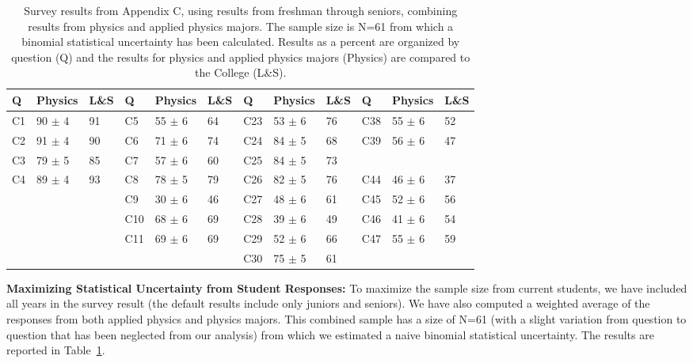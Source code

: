 \documentclass[12pt]{article}
\begin{document}
\begin{table}[htbp]
\caption{\label{tbl:appc} Survey results from Appendix C, using results from freshman through 
seniors, combining results from physics and applied physics majors. The sample size is N=61 
from which a binomial statistical uncertainty has been calculated.  Results as a percent are 
organized by question (Q) and the results for physics and applied physics majors (Physics) are 
compared to the College (L\&S).}
\begin{center}
\begin{tabular}{|lll|lll|lll|lll|}
\hline
Q & Physics & L\&S & Q & Physics & L\&S & Q & Physics & L\&S & Q & Physics & L\&S \\
\hline
C1 & 90 $\pm$ 4 & 91 & C5  & 55 $\pm$ 6 & 64 & C23 & 53 $\pm$ 6 & 76 & C38 & 55 $\pm$ 6 & 52 \\
C2 & 91 $\pm$ 4 & 90 & C6  & 71 $\pm$ 6 & 74 & C24 & 84 $\pm$ 5 & 68 & C39 & 56 $\pm$ 6 & 47 \\
C3 & 79 $\pm$ 5 & 85 & C7  & 57 $\pm$ 6 & 60 & C25 & 84 $\pm$ 5 & 73 &     &            &    \\                  
C4 & 89 $\pm$ 4 & 93 & C8  & 78 $\pm$ 5 & 79 & C26 & 82 $\pm$ 5 & 76 & C44 & 46 $\pm$ 6 & 37 \\
~  &            &    & C9  & 30 $\pm$ 6 & 46 & C27 & 48 $\pm$ 6 & 61 & C45 & 52 $\pm$ 6 & 56 \\
~  &            &    & C10 & 68 $\pm$ 6 & 69 & C28 & 39 $\pm$ 6 & 49 & C46 & 41 $\pm$ 6 & 54 \\
~  &            &    & C11 & 69 $\pm$ 6 & 69 & C29 & 52 $\pm$ 6 & 66 & C47 & 55 $\pm$ 6 & 59 \\
~  &            &    &     &            &    & C30 & 75 $\pm$ 5 & 61 &     &            &    \\
\hline 
\end{tabular}
\end{center}
\end{table}

\noindent
{\bf Maximizing Statistical Uncertainty from Student Responses:}
To maximize the sample size from current students, we have included
all years in the survey result (the default results include only
juniors and seniors).  We have also computed a weighted average of the
responses from both applied physics and physics majors.  This combined
sample has a size of N=61 (with a slight variation from question to
question that has been neglected from our analysis) from which we
estimated a naive binomial statistical uncertainty.  The results are
reported in Table~\ref{tbl:appc}.\\[3pt]
\end{document}
